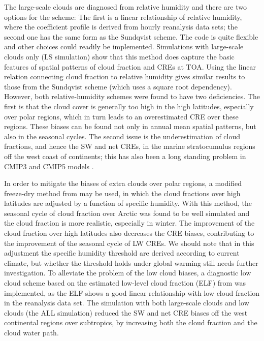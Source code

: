 The large-scale clouds are diagnosed from relative humidity and there are two options for the scheme: The first is a linear relationship of relative humidity, where the coefficient profile is derived from hourly reanalysis data sets; the second one has the same form as the Sundqvist scheme. The code is quite flexible and other choices could readily be implemented. Simulations with large-scale clouds only (LS simulation) show that this method does capture the basic features of spatial patterns of cloud fraction and CREs at TOA. Using the linear relation connecting cloud fraction to relative humidity gives similar results to those from the Sundqvist scheme (which uses a square root dependency). However, both relative-humidity schemes were found to have two deficiencies. The first is that the cloud cover is generally too high in the high latitudes, especially over polar regions, which in turn leads to an overestimated CRE over these regions. These biases can be found not only in annual mean spatial patterns, but also in the seasonal cycles. The second issue is the underestimation of cloud fractions, and hence the SW and net CREs, in the marine stratocumulus regions off the west coast of continents; this has also been a long standing problem in CMIP3 and CMIP5 models \citep{Dolinar2015}. 

In order to mitigate the biases of extra clouds over polar regions, a modified freeze-dry method from \cite{Vavrus2008} may be used, in which the cloud fractions over high latitudes are adjusted by a function of specific humidity. With this method, the seasonal cycle of cloud fraction over Arctic was found to be well simulated and the cloud fraction is more realistic, especially in winter. The improvement of the cloud fraction over high latitudes also decreases the CRE biases, contributing to the improvement of the seasonal cycle of LW CREs. We should note that in this adjustment the specific humidity threshold are derived according to current climate, but whether the threshold holds under global warming still needs further investigation. To alleviate the problem of the low cloud biases, a diagnostic low cloud scheme based on the estimated low-level cloud fraction (ELF) from \citet{Park2019} was implemented, as the ELF shows a good linear relationship with low cloud fraction in the reanalysis data set. The simulation with both large-scale clouds and low clouds (the ALL simulation) reduced the SW and net CRE biases off the west continental regions over subtropics, by increasing both the cloud fraction and the cloud water path.

